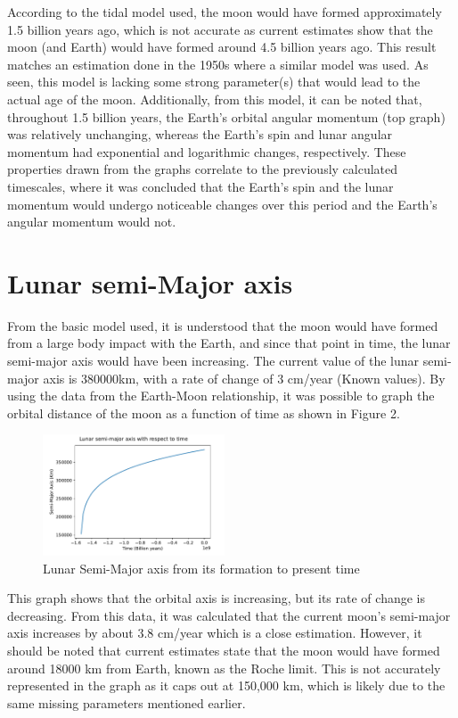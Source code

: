\documentclass[final,5p,times,twocolumn,authoryear]{elsarticle}
\begin{document}
According to the tidal model used, the moon would have formed approximately 1.5 billion years ago, which is not accurate as current estimates show that the moon (and Earth) would have formed around 4.5 billion years ago. This result matches an estimation done in the 1950s where a similar model was used. As seen, this model is lacking some strong parameter(s) that would lead to the actual age of the moon. Additionally, from this model, it can be noted that, throughout 1.5 billion years, the Earth's orbital angular momentum (top graph) was relatively unchanging, whereas the Earth's spin and lunar angular momentum had exponential and logarithmic changes, respectively. These properties drawn from the graphs correlate to the previously calculated timescales, where it was concluded that the Earth's spin and the lunar momentum would undergo noticeable changes over this period and the Earth's angular momentum would not.

\section{Lunar semi-Major axis}
From the basic model used, it is understood that the moon would have formed from a large body impact with the Earth, and since that point in time, the lunar semi-major axis would have been increasing. The current value of the lunar semi-major axis is 380000km, with a rate of change of 3 cm/year (Known values). By using the data from the Earth-Moon relationship, it was possible to graph the orbital distance of the moon as a function of time as shown in Figure 2.

\begin{figure}[!h]
	\centering 
	\includegraphics[width=0.48\textwidth]{semi major axis.pdf}	
	\caption{Lunar Semi-Major axis from its formation to present time} 
\end{figure}

This graph shows that the orbital axis is increasing, but its rate of change is decreasing. From this data, it was calculated that the current moon's semi-major axis increases by about 3.8 cm/year which is a close estimation. However, it should be noted that current estimates state that the moon would have formed around 18000 km from Earth, known as the Roche limit. This is not accurately represented in the graph as it caps out at 150,000 km, which is likely due to the same missing parameters mentioned earlier. 
\end{document}
